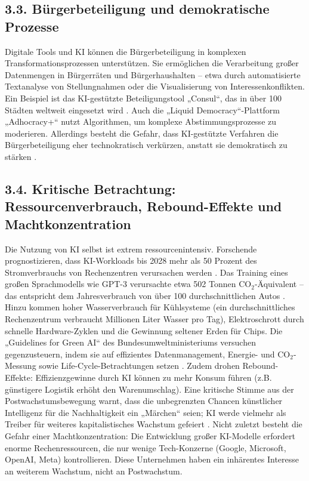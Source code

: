 \documentclass[12pt, a4paper]{article}
\begin{document}
	\subsection*{3.3. Bürgerbeteiligung und demokratische Prozesse}
	Digitale Tools und KI können die Bürgerbeteiligung in komplexen Transformationsprozessen
	unterstützen. Sie ermöglichen die Verarbeitung großer Datenmengen in Bürgerräten und
	Bürgerhaushalten – etwa durch automatisierte Textanalyse von Stellungnahmen oder
	die Visualisierung von Interessenkonflikten. Ein Beispiel ist das KI-gestützte
	Beteiligungstool „Consul“, das in über 100 Städten weltweit eingesetzt wird
	\cite{ki-buergerbeteiligung}. Auch die „Liquid Democracy“-Plattform „Adhocracy+“
	nutzt Algorithmen, um komplexe Abstimmungsprozesse zu moderieren. Allerdings besteht
	die Gefahr, dass KI-gestützte Verfahren die Bürgerbeteiligung eher technokratisch
	verkürzen, anstatt sie demokratisch zu stärken \cite{ki-demokratie2024}.
	
	\subsection*{3.4. Kritische Betrachtung: Ressourcenverbrauch, Rebound-Effekte und Machtkonzentration}
	Die Nutzung von KI selbst ist extrem ressourcenintensiv. Forschende prognostizieren,
	dass KI-Workloads bis 2028 mehr als 50 Prozent des Stromverbrauchs von Rechenzentren
	verursachen werden \cite{ki-ressourcen2025}. Das Training eines großen Sprachmodells
	wie GPT-3 verursachte etwa 502 Tonnen CO$_2$-Äquivalent – das entspricht dem
	Jahresverbrauch von über 100 durchschnittlichen Autos \cite{strubell2019}. Hinzu kommen
	hoher Wasserverbrauch für Kühlsysteme (ein durchschnittliches Rechenzentrum verbraucht
	Millionen Liter Wasser pro Tag), Elektroschrott durch schnelle Hardware-Zyklen und
	die Gewinnung seltener Erden für Chips. Die „Guidelines for Green AI“ des
	Bundesumweltministeriums versuchen gegenzusteuern, indem sie auf effizientes
	Datenmanagement, Energie- und CO$_2$-Messung sowie Life-Cycle-Betrachtungen setzen
	\cite{greenai2025b}. Zudem drohen Rebound-Effekte: Effizienzgewinne durch KI können
	zu mehr Konsum führen (z.B. günstigere Logistik erhöht den Warenumschlag). Eine
	kritische Stimme aus der Postwachstumsbewegung warnt, dass die unbegrenzten Chancen
	künstlicher Intelligenz für die Nachhaltigkeit ein „Märchen“ seien; KI werde vielmehr
	als Treiber für weiteres kapitalistisches Wachstum gefeiert \cite{postwachstumKI2}.
	Nicht zuletzt besteht die Gefahr einer Machtkonzentration: Die Entwicklung großer
	KI-Modelle erfordert enorme Rechenressourcen, die nur wenige Tech-Konzerne (Google,
	Microsoft, OpenAI, Meta) kontrollieren. Diese Unternehmen haben ein inhärentes
	Interesse an weiterem Wachstum, nicht an Postwachstum.
	
\end{document}
